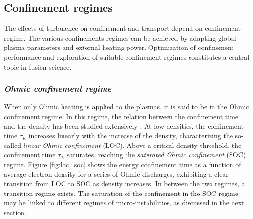 \subsection{Confinement regimes} \label{sec:confine_regime}

The effects of turbulence on confinement and transport depend on confinement regime. The various confinements regimes can be achieved by adapting global plasma parameters and external heating power. Optimization of confinement performance and exploration of suitable confinement regimes constitutes a central topic in fusion science.


\subsubsection*{\emph{Ohmic confinement regime}}

When only Ohmic heating is applied to the plasmas, it is said to be in the Ohmic confinement regime. In this regime, the relation between the confinement time and the density has been studied extensively \cite{Yushmanov_1999_NF}. At low densities, the confinement time $\tau_{E}$ increases linearly with the increase of the density, characterizing the so-called \emph{linear Ohmic confinement} (LOC). Above a critical density threshold, the confinement time $\tau_{E}$ saturates, reaching the \emph{saturated Ohmic confinement} (SOC) regime. Figure \ref{fig:loc_soc} shows the energy confinement time as a function of average electron density for a series of Ohmic discharges, exhibiting a clear transition from LOC to SOC as density increases. In between the two regimes, a transition regime exists. The saturation of the confinement in the SOC regime may be linked to different regimes of micro-instabilities, as discussed in the next section.

